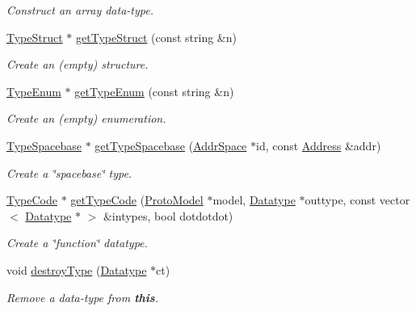\begin{DoxyCompactItemize}
\begin{DoxyCompactList}\small\item\em Construct an array data-\/type. \end{DoxyCompactList}\item 
\mbox{\hyperlink{class_type_struct}{Type\+Struct}} $\ast$ \mbox{\hyperlink{class_type_factory_aaa4a75179b840571eeb97e24642c55ee}{get\+Type\+Struct}} (const string \&n)
\begin{DoxyCompactList}\small\item\em Create an (empty) structure. \end{DoxyCompactList}\item 
\mbox{\hyperlink{class_type_enum}{Type\+Enum}} $\ast$ \mbox{\hyperlink{class_type_factory_a3bb1aba15e198a7ba2b67741c571de3a}{get\+Type\+Enum}} (const string \&n)
\begin{DoxyCompactList}\small\item\em Create an (empty) enumeration. \end{DoxyCompactList}\item 
\mbox{\hyperlink{class_type_spacebase}{Type\+Spacebase}} $\ast$ \mbox{\hyperlink{class_type_factory_a85de9d19ce1dc44476a414f5ce69b97e}{get\+Type\+Spacebase}} (\mbox{\hyperlink{class_addr_space}{Addr\+Space}} $\ast$id, const \mbox{\hyperlink{class_address}{Address}} \&addr)
\begin{DoxyCompactList}\small\item\em Create a \char`\"{}spacebase\char`\"{} type. \end{DoxyCompactList}\item 
\mbox{\hyperlink{class_type_code}{Type\+Code}} $\ast$ \mbox{\hyperlink{class_type_factory_a99362bf53b0ead2d57a2221bc2fd03cc}{get\+Type\+Code}} (\mbox{\hyperlink{class_proto_model}{Proto\+Model}} $\ast$model, \mbox{\hyperlink{class_datatype}{Datatype}} $\ast$outtype, const vector$<$ \mbox{\hyperlink{class_datatype}{Datatype}} $\ast$ $>$ \&intypes, bool dotdotdot)
\begin{DoxyCompactList}\small\item\em Create a \char`\"{}function\char`\"{} datatype. \end{DoxyCompactList}\item 
void \mbox{\hyperlink{class_type_factory_ab4edd4fa31629380ec4124c840022f5a}{destroy\+Type}} (\mbox{\hyperlink{class_datatype}{Datatype}} $\ast$ct)
\begin{DoxyCompactList}\small\item\em Remove a data-\/type from {\bfseries{this}}. \end{DoxyCompactList}\item 

\end{DoxyCompactItemize}
